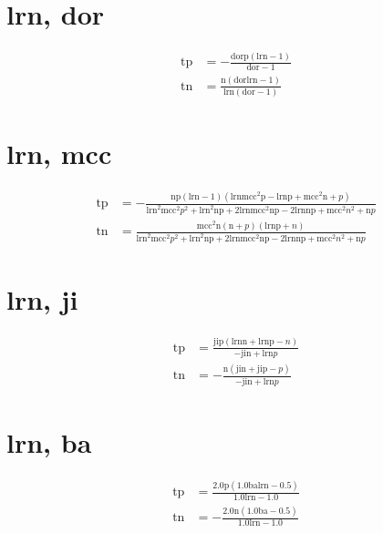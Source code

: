 \documentclass[3p,times]{elsarticle}
\begin{document}
\begin{footnotesize}
\begin{landscape}
\section{lrn, dor}
\begin{align}
\mathrm{tp} &= - \frac{\mathrm{dor} \mathrm{p} \left(\mathrm{lrn} - 1\right)}{\mathrm{dor} - 1}\\
\mathrm{tn} &= \frac{\mathrm{n} \left(\mathrm{dor} \mathrm{lrn} - 1\right)}{\mathrm{lrn} \left(\mathrm{dor} - 1\right)}
\end{align}
\section{lrn, mcc}
\begin{align}
\mathrm{tp} &= - \frac{\mathrm{n} \mathrm{p} \left(\mathrm{lrn} - 1\right) \left(\mathrm{lrn} \mathrm{mcc}^{2} \mathrm{p} - \mathrm{lrn} \mathrm{p} + \mathrm{mcc}^{2} \mathrm{n} + p\right)}{\mathrm{lrn}^{2} \mathrm{mcc}^{2} p^{2} + \mathrm{lrn}^{2} \mathrm{n} \mathrm{p} + 2 \mathrm{lrn} \mathrm{mcc}^{2} \mathrm{n} \mathrm{p} - 2 \mathrm{lrn} \mathrm{n} \mathrm{p} + \mathrm{mcc}^{2} n^{2} + \mathrm{n} p}\\
\mathrm{tn} &= \frac{\mathrm{mcc}^{2} \mathrm{n} \left(\mathrm{n} + p\right) \left(\mathrm{lrn} \mathrm{p} + n\right)}{\mathrm{lrn}^{2} \mathrm{mcc}^{2} p^{2} + \mathrm{lrn}^{2} \mathrm{n} \mathrm{p} + 2 \mathrm{lrn} \mathrm{mcc}^{2} \mathrm{n} \mathrm{p} - 2 \mathrm{lrn} \mathrm{n} \mathrm{p} + \mathrm{mcc}^{2} n^{2} + \mathrm{n} p}
\end{align}
\section{lrn, ji}
\begin{align}
\mathrm{tp} &= \frac{\mathrm{ji} \mathrm{p} \left(\mathrm{lrn} \mathrm{n} + \mathrm{lrn} \mathrm{p} - n\right)}{- \mathrm{ji} \mathrm{n} + \mathrm{lrn} p}\\
\mathrm{tn} &= - \frac{\mathrm{n} \left(\mathrm{ji} \mathrm{n} + \mathrm{ji} \mathrm{p} - p\right)}{- \mathrm{ji} \mathrm{n} + \mathrm{lrn} p}
\end{align}
\section{lrn, ba}
\begin{align}
\mathrm{tp} &= \frac{2.0 \mathrm{p} \left(1.0 \mathrm{ba} \mathrm{lrn} - 0.5\right)}{1.0 \mathrm{lrn} - 1.0}\\
\mathrm{tn} &= - \frac{2.0 \mathrm{n} \left(1.0 \mathrm{ba} - 0.5\right)}{1.0 \mathrm{lrn} - 1.0}
\end{align}

\end{landscape}
\end{footnotesize}
\end{document}
